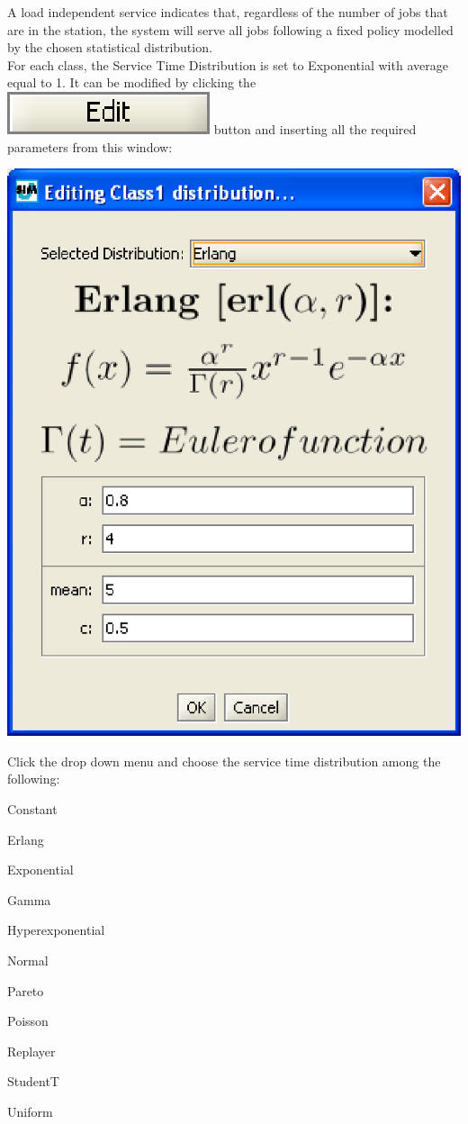 A load independent service indicates that, regardless of the number of jobs that are in the station, the system will serve all jobs following a fixed policy modelled by the chosen statistical distribution.\\
For each class, the Service Time Distribution is set to Exponential with average equal to 1. It can be modified by clicking the  \includegraphics[scale=.5]{img/jsim/edit.eps} button and inserting all the required parameters from this window:
\begin{center}
\includegraphics[scale=.5]{img/jsim/erlang.eps}
\end{center}
Click the drop down menu and choose the service time distribution among the following:
\begin{itemize*}
\item Constant
\item Erlang
\item Exponential
\item Gamma
\item Hyperexponential
\item Normal
\item Pareto
\item Poisson
\item Replayer
\item StudentT
\item Uniform
\end{itemize*}
